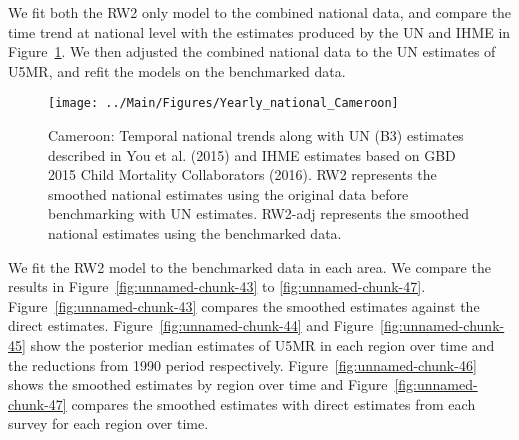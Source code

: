 \documentclass[12pt]{article}\usepackage[]{graphicx}\usepackage[]{color}
\newenvironment{knitrout}{}{} %
\begin{document}
We fit both the RW2 only model to the combined national data, and compare the time trend at national level with the estimates produced by the UN and IHME in Figure~\ref{fig:unnamed-chunk-42}. We then adjusted the combined national data to the UN estimates of U5MR, and refit the models on the benchmarked data. 

\begin{knitrout}
\color{fgcolor}\begin{figure}[bht]

{\centering \texttt{[image: ../Main/Figures/Yearly\_national\_Cameroon]} 

}

\caption[Cameroon]{Cameroon: Temporal national trends along with UN (B3) estimates described in You et al. (2015) and IHME estimates based on GBD 2015 Child Mortality Collaborators (2016). RW2 represents the smoothed national estimates using the original data before benchmarking with UN estimates. RW2-adj represents the smoothed national estimates using the benchmarked data.}\label{fig:unnamed-chunk-42}
\end{figure}


\end{knitrout}
 

We fit the RW2 model to the benchmarked data in each area. 
We compare the results in Figure~\ref{fig:unnamed-chunk-43} to \ref{fig:unnamed-chunk-47}.
Figure~\ref{fig:unnamed-chunk-43} compares the smoothed estimates against the direct estimates. Figure~\ref{fig:unnamed-chunk-44} and Figure~\ref{fig:unnamed-chunk-45} show the posterior median estimates of U5MR in each region over time and the reductions from 1990 period respectively.
Figure~\ref{fig:unnamed-chunk-46} shows the smoothed estimates by region over time and Figure~\ref{fig:unnamed-chunk-47} compares the smoothed estimates with direct estimates from each survey for each region over time.




\end{document}
